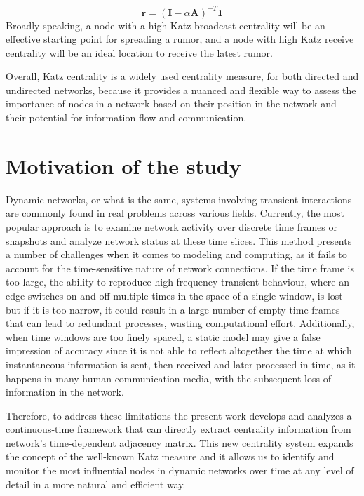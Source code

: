 \begin{equation}
\label{eqn:receiv}
    \mathbf{r} = (\mathbf{I}-\alpha\mathbf{A})^{-T} \mathbf{1}
\end{equation}
Broadly speaking, a node with a high Katz broadcast centrality will be an effective starting point for spreading a rumor, and a node with high Katz receive centrality will be an ideal location to receive the latest rumor.

Overall, Katz centrality is a widely used centrality measure, for both directed and undirected networks, because it provides a nuanced and flexible way to assess the importance of nodes in a network based on their position in the network and their potential for information flow and communication.

\section{Motivation of the study}
\label{sec:motiv}
Dynamic networks, or what is the same, systems involving transient interactions are commonly found in real problems across various fields. Currently, the most popular approach is to examine network activity over discrete time frames or snapshots and analyze network status at these time slices. This method presents a number of challenges when it comes to modeling and computing, as it fails to account for the time-sensitive nature of network connections. If the time frame is too large, the ability to reproduce high-frequency transient behaviour, where an edge switches on and off multiple times in the space of a single window, is lost but if it is too narrow, it could result in a large number of empty time frames that can lead to redundant processes, wasting computational effort. Additionally, when time windows are too finely spaced, a static model may give a false impression of accuracy since it is not able to reflect altogether the time at which instantaneous information is sent, then received and later processed in time, as it happens in many human communication media, with the subsequent loss of information in the network.

Therefore, to address these limitations the present work develops and analyzes a continuous-time framework that can directly extract centrality information from network's time-dependent adjacency matrix. This new centrality system expands the concept of the well-known Katz measure and it allows us to identify and monitor the most influential nodes in dynamic networks over time at any level of detail in a more natural and efficient way.

